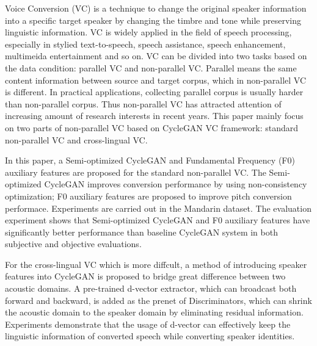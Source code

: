 \begin{enabstract}
  Voice Conversion (VC) is a technique to change the original speaker information 
  into a specific target speaker by changing the timbre and tone while preserving 
  linguistic information. VC is widely applied in the field of speech processing, 
  especially in stylied text-to-speech, speech assistance, speech enhancement, 
  multimeida entertainment and so on. VC can be divided into two tasks based on the 
  data condition: parallel VC and non-parallel VC. Parallel means the same content
  information between source and target corpus, which in non-parallel VC is different.
  In practical applications, collecting parallel corpus is usually harder than non-parallel
  corpus. Thus non-parallel VC has attracted attention of increasing amount of research 
  interests in recent years. This paper mainly focus on two parts of non-parallel VC based
  on CycleGAN VC framework: standard non-parallel VC and cross-lingual VC.

  In this paper, a Semi-optimized CycleGAN and Fundamental Frequency (F0) auxiliary features are
  proposed for the standard non-parallel VC. The Semi-optimized CycleGAN improves conversion 
  performance by using non-consistency optimization; F0 auxiliary features are proposed 
  to improve pitch conversion performace. Experiments are carried out in the Mandarin dataset. 
  The evaluation experiment shows that Semi-optimized CycleGAN and F0 auxiliary features have 
  significantly better performance than baseline CycleGAN system in both subjective and objective
  evaluations.

  For the cross-lingual VC which is more diffcult, a method of introducing speaker features into 
  CycleGAN is proposed to bridge great difference between two acoustic domains. A pre-trained d-vector 
  extractor, which can broadcast both forward and backward, is added as the prenet of Discriminators, 
  which can shrink the acoustic domain to the speaker domain by eliminating residual information.
  Experiments demonstrate that the usage of d-vector can effectively keep the linguistic
  information of converted speech while converting speaker identities.


\end{enabstract}
